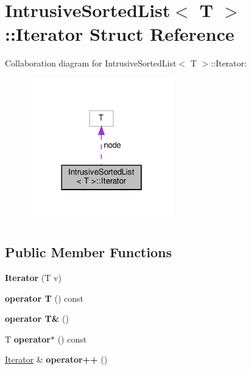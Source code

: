 \hypertarget{structIntrusiveSortedList_1_1Iterator}{}\section{Intrusive\+Sorted\+List$<$ T $>$\+:\+:Iterator Struct Reference}
\label{structIntrusiveSortedList_1_1Iterator}


Collaboration diagram for Intrusive\+Sorted\+List$<$ T $>$\+:\+:Iterator\+:\nopagebreak
\begin{figure}[H]
\begin{center}
\leavevmode
\includegraphics[width=178pt]{db/dab/structIntrusiveSortedList_1_1Iterator__coll__graph}
\end{center}
\end{figure}
\subsection*{Public Member Functions}
\begin{DoxyCompactItemize}
\item 
\mbox{\label{structIntrusiveSortedList_1_1Iterator_ab9256df4261a73c93e6408c617176082}} 
{\bfseries Iterator} (T v)
\item 
\mbox{\label{structIntrusiveSortedList_1_1Iterator_a22f0efa8317f852d8bc4f8ba44dccd7e}} 
{\bfseries operator T} () const
\item 
\mbox{\label{structIntrusiveSortedList_1_1Iterator_a9c9a2607d2d91b56a4b0a6dc43e8773f}} 
{\bfseries operator T\&} ()
\item 
\mbox{\label{structIntrusiveSortedList_1_1Iterator_ad5f48f07778b9d2079fac77dcfc1cc86}} 
T {\bfseries operator$\ast$} () const
\item 
\mbox{\label{structIntrusiveSortedList_1_1Iterator_a4daeb2b5c9df2555bc99ba6cfe91ad4e}} 
\hyperlink{structIntrusiveSortedList_1_1Iterator}{Iterator} \& {\bfseries operator++} ()
\end{DoxyCompactItemize}
